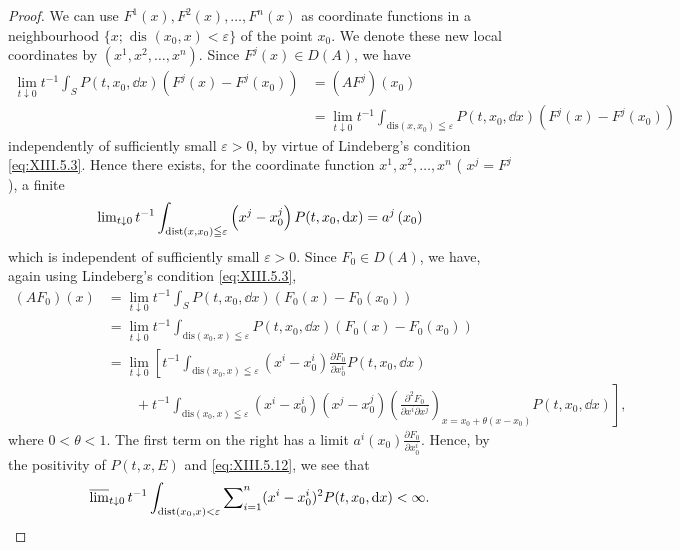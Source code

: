 \begin{proof}
We can use $F^1(x), F^2(x), \ldots, F^n(x)$ as coordinate functions in a neighbourhood $\{x; \text{ dis }(x_0, x) < \varepsilon\}$ of the point $x_0$. We denote these new local coordinates by $(x^1, x^2, \ldots, x^n)$. Since $F^j(x) \in D(A)$, we have 
\[
\begin{aligned}
\underset {t \downarrow 0} {\lim} t ^{-1} \int_{S} P (t, x _{0}, \dd x) (F ^{j} (x) - F ^{j} (x _{0})) &= (A F ^{j}) (x _{0})
\\
&= \underset {t \downarrow 0} {\lim} t ^{-1} \int_ {\mathrm{dis} (x, x _{0}) \leqq \varepsilon} P (t, x _{0}, \dd x) (F ^{j} (x) - F ^{j} (x _{0}))
\end{aligned}
\]
independently of sufficiently small $\varepsilon > 0$, by virtue of Lindeberg's condition \eqref{eq:XIII.5.3}. Hence there exists, for the coordinate function $x^1, x^2, \ldots, x^n$ ( $x^j = F^j$), a finite 
\begin{equation}\label{eq:XIII.5.13}
\lim\nolimits _{t \downarrow 0} t ^{-1} \int_ {\operatorname{dist} (x, x _{0}) \leqq \varepsilon} \left(x ^{j} - x _{0} ^{j}\right) P (t, x _{0}, \mathop{}\!\mathrm{d} x) = a ^{j} \left(x _{0}\right)
\end{equation}
which is independent of sufficiently small $\varepsilon > 0$. Since $F_0 \in D(A)$, we have, again using Lindeberg's condition \eqref{eq:XIII.5.3}, 
\[
\begin{aligned}
(A F _{0}) (x) &= \lim\limits _{t \downarrow 0} t ^{-1} \int_{S} P (t, x _{0}, \dd x) (F _{0} (x) - F _{0} (x _{0}))
\\
&= \lim\limits _{t \downarrow 0} t ^{-1} \int_ {\mathrm{dis} (x _{0}, x) \leqq \varepsilon} P (t, x _{0}, \dd x) (F _{0} (x) - F _{0} (x _{0}))
\\
&= \lim\limits _{t \downarrow 0} \left[ t ^{-1} \int_ {\mathrm{dis} (x _{0}, x) \leqq \varepsilon} (x ^{i} - x _{0} ^{i}) \frac {\partial F _{0}}{\partial x _{0} ^{i}} P (t, x _{0}, \dd x) \right.
\\
& \qquad + \left. t ^{-1} \int_ {\mathrm{dis} (x _{0}, x) \leqq \varepsilon} (x ^{i} - x _{0} ^{i}) (x ^{j} - x _{0} ^{j}) \left(\frac {\partial^{2} F _{0}}{\partial x ^{i} \partial x ^{j}}\right) _ {x = x _{0} + \theta (x - x _{0})} P (t, x _{0}, \dd x) \right],
\end{aligned}
\]
where $0 < \theta < 1$. The first term on the right has a limit $a^i(x_0) \frac{\partial F_0}{\partial x_0^i}$. Hence, by the positivity of $P(t, x, E)$ and \eqref{eq:XIII.5.12}, we see that 
\begin{equation}\label{eq:XIII.5.14}
\varlimsup\nolimits_{t \downarrow 0} t ^{-1} \int_ {\operatorname{dist} (x _{0}, x) < \varepsilon} \sum\nolimits_{i=1} ^{n} (x ^{i} - x _{0} ^{i}) ^{2} P (t, x _{0}, \mathop{}\!\mathrm{d} x) < \infty .
\end{equation}


\end{proof}
